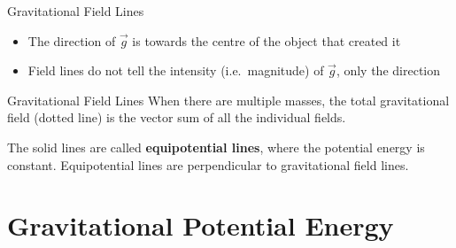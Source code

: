\documentclass[12pt,compress,aspectratio=169]{beamer}
\begin{document}
\begin{frame}{Gravitational Field Lines}
  \begin{center}
  \end{center}
  \begin{itemize}
  \item The direction of $\vec g$ is towards the centre of the object that
    created it
  \item Field lines do not tell the intensity (i.e.\ magnitude) of $\vec g$,
    only the direction
  \end{itemize}
\end{frame}



\begin{frame}{Gravitational Field Lines}
  When there are multiple masses, the total gravitational field (dotted line)
  is the vector sum of all the individual fields.
  \begin{center}
  \end{center}
  The solid lines are called \textbf{equipotential lines}, where the potential
  energy is constant. Equipotential lines are perpendicular to
  gravitational field lines.
\end{frame}



\section{Gravitational Potential Energy}
\end{document}

